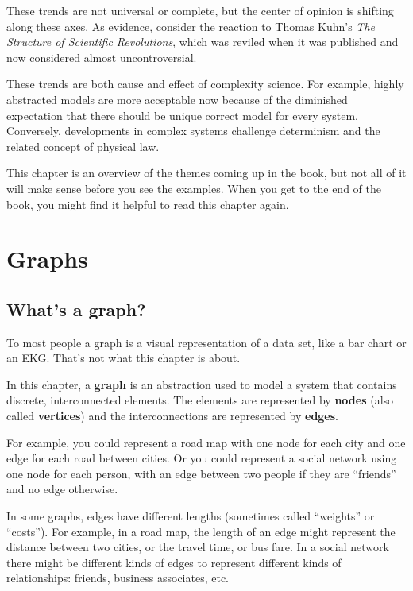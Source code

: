 \documentclass[10pt]{book}
\begin{document}
These trends are not universal or complete, but the center of
opinion is shifting along these axes.  As evidence, consider the
reaction to Thomas Kuhn's {\em The Structure of Scientific
  Revolutions}, which was reviled when it was published and
now considered almost uncontroversial.

These trends are both cause and effect of complexity science.  For
example, highly abstracted models are more acceptable now because of
the diminished expectation that there should be unique correct model
for every system.  Conversely, developments in complex systems
challenge determinism and the related concept of physical law.

This chapter is an overview of the themes coming up in the book, but
not all of it will make sense before you see the examples.  When you
get to the end of the book, you might find it helpful to read this
chapter again.


\chapter{Graphs}

\section{What's a graph?}

To most people a graph is a visual representation of a data set, like
a bar chart or an EKG.  That's not what this chapter is about.

In this chapter, a {\bf graph} is an abstraction used to
model a system that contains discrete, interconnected elements.  The
elements are represented by {\bf nodes} (also called {\bf vertices})
and the interconnections are represented by {\bf edges}.

For example, you could represent a road map with one node for each
city and one edge for each road between cities.  Or you could
represent a social network using one node for each person, with an
edge between two people if they are ``friends'' and no edge otherwise.

In some graphs, edges have different lengths (sometimes
called ``weights'' or ``costs'').  For example, in a road map, the
length of an edge might represent the distance between
two cities, or the travel time, or bus fare.
In a social network there might be different kinds of
edges to represent different kinds of relationships: friends,
business associates, etc.
\end{document}
